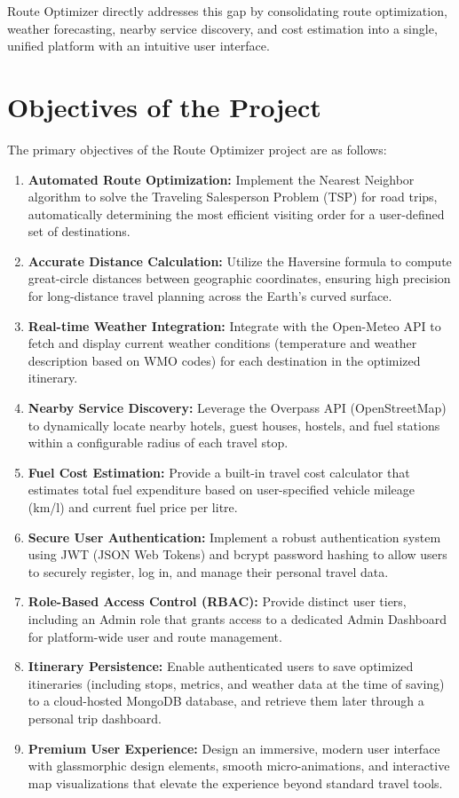Route Optimizer directly addresses this gap by consolidating route optimization, weather forecasting, nearby service discovery, and cost estimation into a single, unified platform with an intuitive user interface.

\section{Objectives of the Project}
The primary objectives of the Route Optimizer project are as follows:
\begin{enumerate}
    \item \textbf{Automated Route Optimization:} Implement the Nearest Neighbor algorithm to solve the Traveling Salesperson Problem (TSP) for road trips, automatically determining the most efficient visiting order for a user-defined set of destinations.
    \item \textbf{Accurate Distance Calculation:} Utilize the Haversine formula to compute great-circle distances between geographic coordinates, ensuring high precision for long-distance travel planning across the Earth's curved surface.
    \item \textbf{Real-time Weather Integration:} Integrate with the Open-Meteo API to fetch and display current weather conditions (temperature and weather description based on WMO codes) for each destination in the optimized itinerary.
    \item \textbf{Nearby Service Discovery:} Leverage the Overpass API (OpenStreetMap) to dynamically locate nearby hotels, guest houses, hostels, and fuel stations within a configurable radius of each travel stop.
    \item \textbf{Fuel Cost Estimation:} Provide a built-in travel cost calculator that estimates total fuel expenditure based on user-specified vehicle mileage (km/l) and current fuel price per litre.
    \item \textbf{Secure User Authentication:} Implement a robust authentication system using JWT (JSON Web Tokens) and bcrypt password hashing to allow users to securely register, log in, and manage their personal travel data.
    \item \textbf{Role-Based Access Control (RBAC):} Provide distinct user tiers, including an Admin role that grants access to a dedicated Admin Dashboard for platform-wide user and route management.
    \item \textbf{Itinerary Persistence:} Enable authenticated users to save optimized itineraries (including stops, metrics, and weather data at the time of saving) to a cloud-hosted MongoDB database, and retrieve them later through a personal trip dashboard.
    \item \textbf{Premium User Experience:} Design an immersive, modern user interface with glassmorphic design elements, smooth micro-animations, and interactive map visualizations that elevate the experience beyond standard travel tools.
\end{enumerate}

